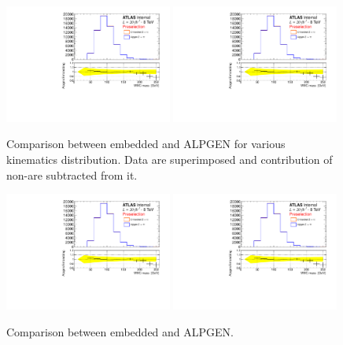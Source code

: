 \begin{figure}[htp]
     \begin{center}

            \includegraphics[page=7, width=0.49\textwidth]{figure/bg_estimation/std_plots_emb.pdf}
            \includegraphics[page=8, width=0.49\textwidth]{figure/bg_estimation/std_plots_emb.pdf}
     \end{center}
     \caption{Comparison between embedded \Ztautau and ALPGEN for various kinematics distribution.
        Data are superimposed and contribution of non-\Ztautau are subtracted from it.}
\end{figure}

\begin{figure}[htp]
     \begin{center}

            \includegraphics[page=9, width=0.49\textwidth]{figure/bg_estimation/std_plots_emb.pdf}
            \includegraphics[page=10, width=0.49\textwidth]{figure/bg_estimation/std_plots_emb.pdf}
     \end{center}
     \caption{Comparison between embedded \Ztautau and ALPGEN.}
\end{figure}


\clearpage



